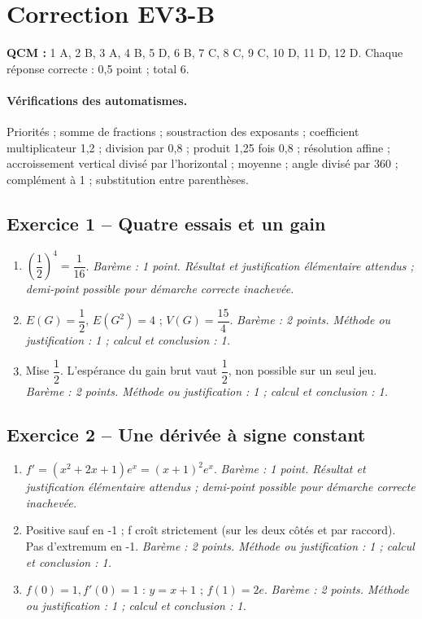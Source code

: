 \clearpage\section*{Correction EV3-B}\label{EV3-B-CORR}
\textbf{QCM :} 1 A, 2 B, 3 A, 4 B, 5 D, 6 B, 7 C, 8 C, 9 C, 10 D, 11 D, 12 D. Chaque réponse correcte : 0,5 point ; total 6.
\paragraph{Vérifications des automatismes.} Priorités ; somme de fractions ; soustraction des exposants ; coefficient multiplicateur 1,2 ; division par 0,8 ; produit 1,25 fois 0,8 ; résolution affine ; accroissement vertical divisé par l’horizontal ; moyenne ; angle divisé par 360 ; complément à 1 ; substitution entre parenthèses.
\subsection*{Exercice 1 -- Quatre essais et un gain}
\begin{enumerate}
\item $(\dfrac{1}{2})^4=\dfrac{1}{16}$. \textit{Barème : 1 point. Résultat et justification élémentaire attendus ; demi-point possible pour démarche correcte inachevée.}
\item $E(G)=\dfrac{1}{2}$, $E(G^2)=4$ ; $V(G)=\dfrac{15}{4}$. \textit{Barème : 2 points. Méthode ou justification : 1 ; calcul et conclusion : 1.}
\item Mise $\dfrac{1}{2}$. L’espérance du gain brut vaut $\dfrac{1}{2}$, non possible sur un seul jeu. \textit{Barème : 2 points. Méthode ou justification : 1 ; calcul et conclusion : 1.}
\end{enumerate}
\subsection*{Exercice 2 -- Une dérivée à signe constant}
\begin{enumerate}
\item $f\prime=(x^2+2x+1)e^x=(x+1)^2e^x$. \textit{Barème : 1 point. Résultat et justification élémentaire attendus ; demi-point possible pour démarche correcte inachevée.}
\item Positive sauf en -1 ; f croît strictement (sur les deux côtés et par raccord). Pas d’extremum en -1. \textit{Barème : 2 points. Méthode ou justification : 1 ; calcul et conclusion : 1.}
\item $f(0)=1,f\prime(0)=1$ : $y=x+1$ ; $f(1)=2e$. \textit{Barème : 2 points. Méthode ou justification : 1 ; calcul et conclusion : 1.}
\end{enumerate}
